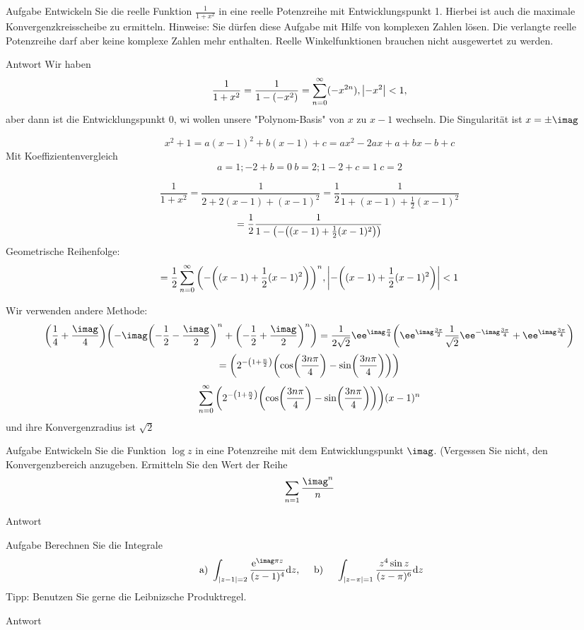 \documentclass{scrartcl}
\begin{document}
\maketitle
\begin{section}{Aufgabe}%
    Entwickeln Sie die reelle Funktion \( \frac{1}{1+x^{2}} \) in eine reelle Potenzreihe mit Entwicklungspunkt 1. Hierbei ist auch die maximale Konvergenzkreisscheibe zu ermitteln. Hinweise: Sie dürfen diese Aufgabe mit Hilfe von komplexen Zahlen lösen. Die verlangte reelle Potenzreihe darf aber keine komplexe Zahlen mehr enthalten. Reelle Winkelfunktionen brauchen nicht ausgewertet zu werden.
 
\begin{subsection}{Antwort}
Wir haben
\[\frac{1}{1+x^2}=\frac{1}{1-(-x^2)}=\sum_{n=0}^\infty (-x^{2n}), \abs{-x^2}<1,\] aber dann ist die Entwicklungspunkt 0, wi wollen unsere "Polynom-Basis" von $x$ zu $x-1$ wechseln.
Die Singularität ist $x=\pm \imag$

\[x^2+1=a (x-1)^2+b(x-1)+c = a x^2-2ax+a+bx-b+c\]
Mit Koeffizientenvergleich
\[a=1;-2+b=0\>b=2;1-2+c=1\>c=2\]

\[\frac{1}{1+x^2}=\frac{1}{2+2(x-1)+(x-1)^2}=\frac{1}{2}\frac{1}{1+(x-1)+\frac{1}{2}(x-1)^2}\]
\[=\frac{1}{2}\frac{1}{1-\qty(-\qty((x-1)+\frac{1}{2}(x-1)^2))}\]
Geometrische Reihenfolge:
\[=\frac{1}{2}\sum_{n=0}^{\infty}\qty(-\qty((x-1)+\frac{1}{2}(x-1)^2))^n, \qty|-\qty((x-1)+\frac{1}{2}(x-1)^2)|<1\]

Wir verwenden andere Methode:
\[\qty(\frac{1}{4}+\frac{\imag}{4})\qty(-\imag\qty(-\frac{1}{2}-\frac{\imag}{2})^n+\qty(-\frac{1}{2}+\frac{\imag}{2})^n)
=\frac{1}{2\sqrt{2}}\ee^{\imag\frac{\pi}{4}}\qty(\ee^{\imag\frac{3\pi}{2}}\frac{1}{\sqrt{2}}\ee^{-\imag \frac{3\pi}{4}}+\ee^{\imag \frac{3\pi}{4}})\]
\[=\qty(2^{-\qty(1+\frac{n}{2})}\qty(\cos(\frac{3 n \pi}{4})-\sin(\frac{3 n \pi}{4})))\]
\[\sum_{n=0}^{\infty}\qty(2^{-\qty(1+\frac{n}{2})}\qty(\cos(\frac{3 n \pi}{4})-\sin(\frac{3 n \pi}{4})))(x-1)^n\]
und ihre Konvergenzradius ist $\sqrt{2}$

\end{subsection}
\end{section}
\begin{section}{Aufgabe}%
    Entwickeln Sie die Funktion \( \log z \) in eine Potenzreihe mit dem Entwicklungspunkt $\imag$. (Vergessen Sie nicht, den Konvergenzbereich anzugeben. Ermitteln Sie den Wert der Reihe \[ \sum_{n=1} \frac{\imag^{n}}{n} \] 
    \begin{subsection}{Antwort}
 
    \end{subsection}
\end{section}
\begin{section}{Aufgabe}
    Berechnen Sie die Integrale \[ \text { a) } \int_{|z-1|=2} \frac{\mathrm{e}^{\imag \pi z}}{(z-1)^{4}} \dd z, \quad \text { b) } \quad \int_{|z-\pi|=1} \frac{z^{4} \sin z}{(z-\pi)^{6}} \dd z \] Tipp: Benutzen Sie gerne die Leibnizsche Produktregel.
      \begin{subsection}{Antwort}

    \end{subsection}  
\end{section}
\end{document}
